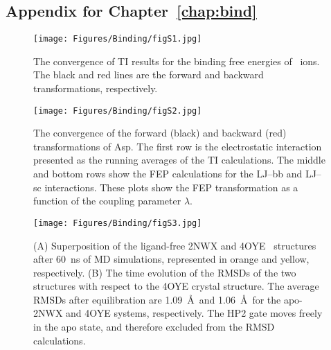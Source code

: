 \pagebreak
\begin{subappendices}
{
\hypersetup{linkcolor=black}
\section{Appendix for Chapter~\ref*{chap:bind}}
}

\begin{figure}[b!]
    \centering
    \texttt{[image: Figures/Binding/figS1.jpg]}
    \caption{The convergence of TI results for the binding free energies of \Na\ ions.
    The black and red lines are the forward and backward transformations,
    respectively.}
    \label{bind:figS1}
\end{figure}

\pagebreak
\begin{sidewaysfigure}
    \centering
    \texttt{[image: Figures/Binding/figS2.jpg]}
    \caption{The convergence of the forward (black) and backward (red) 
    transformations of Asp. The first row is the electrostatic interaction
    presented as the running averages of the TI calculations. The middle 
    and bottom rows show the FEP calculations for the LJ--bb and LJ--sc interactions.
    These plots show the FEP transformation as a function of the coupling 
    parameter $\lambda$.}
    \label{bind:figS2}
\end{sidewaysfigure}

\pagebreak
\begin{figure}
    \centering
    \texttt{[image: Figures/Binding/figS3.jpg]}
    \caption{(A) Superposition of the ligand-free 2NWX and 4OYE \GltPh\ structures
    after 60~ns of MD simulations, represented in orange and yellow, respectively.
    (B) The time evolution of the RMSDs of the two structures with respect to 
    the 4OYE crystal structure. The average RMSDs 
    after equilibration are 1.09~\AA\ and 1.06~\AA\ for the apo-2NWX and 4OYE 
    systems, respectively. The HP2 gate moves freely in the apo state, and therefore 
    excluded from the RMSD calculations.}
    \label{bind:figS3}
\end{figure}

\end{subappendices}

